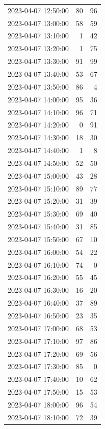 \documentclass[
  letterpaper,
  DIV=11,
  numbers=noendperiod]{scrartcl}
\begin{document}
\begin{tabular}{lrr}
2023-04-07 12:50:00 &    80 &    96 \\
2023-04-07 13:00:00 &    58 &    59 \\
2023-04-07 13:10:00 &     1 &    42 \\
2023-04-07 13:20:00 &     1 &    75 \\
2023-04-07 13:30:00 &    91 &    99 \\
2023-04-07 13:40:00 &    53 &    67 \\
2023-04-07 13:50:00 &    86 &     4 \\
2023-04-07 14:00:00 &    95 &    36 \\
2023-04-07 14:10:00 &    96 &    71 \\
2023-04-07 14:20:00 &     0 &    91 \\
2023-04-07 14:30:00 &    18 &    30 \\
2023-04-07 14:40:00 &     1 &     8 \\
2023-04-07 14:50:00 &    52 &    50 \\
2023-04-07 15:00:00 &    43 &    28 \\
2023-04-07 15:10:00 &    89 &    77 \\
2023-04-07 15:20:00 &    31 &    39 \\
2023-04-07 15:30:00 &    69 &    40 \\
2023-04-07 15:40:00 &    31 &    85 \\
2023-04-07 15:50:00 &    67 &    10 \\
2023-04-07 16:00:00 &    54 &    22 \\
2023-04-07 16:10:00 &    74 &     0 \\
2023-04-07 16:20:00 &    55 &    45 \\
2023-04-07 16:30:00 &    16 &    20 \\
2023-04-07 16:40:00 &    37 &    89 \\
2023-04-07 16:50:00 &    23 &    35 \\
2023-04-07 17:00:00 &    68 &    53 \\
2023-04-07 17:10:00 &    97 &    86 \\
2023-04-07 17:20:00 &    69 &    56 \\
2023-04-07 17:30:00 &    85 &     0 \\
2023-04-07 17:40:00 &    10 &    62 \\
2023-04-07 17:50:00 &    15 &    53 \\
2023-04-07 18:00:00 &    96 &    54 \\
2023-04-07 18:10:00 &    72 &    39 \\

\end{tabular}
\end{document}
